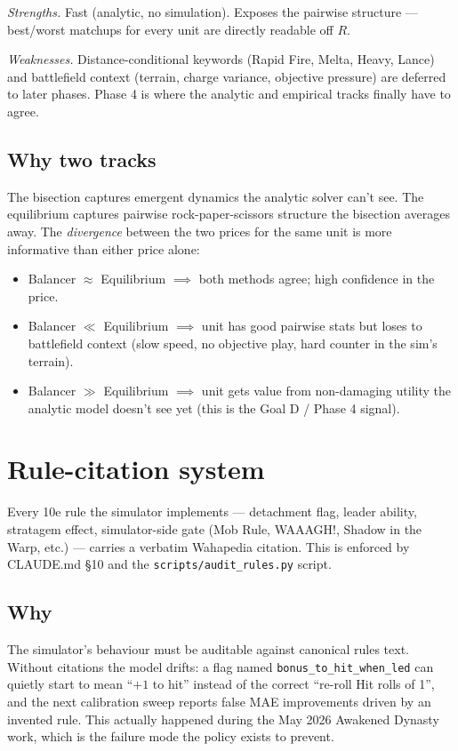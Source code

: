 \documentclass[11pt,a4paper]{article}
\begin{document}
\emph{Strengths.} Fast (analytic, no simulation). Exposes the pairwise
structure --- best/worst matchups for every unit are directly readable
off $R$.

\emph{Weaknesses.} Distance-conditional keywords (Rapid Fire, Melta,
Heavy, Lance) and battlefield context (terrain, charge variance,
objective pressure) are deferred to later phases. Phase 4 is where the
analytic and empirical tracks finally have to agree.

\subsection{Why two tracks}

The bisection captures emergent dynamics the analytic solver can't see.
The equilibrium captures pairwise rock-paper-scissors structure the
bisection averages away. The \emph{divergence} between the two prices
for the same unit is more informative than either price alone:

\begin{itemize}[itemsep=2pt]
  \item Balancer $\approx$ Equilibrium $\implies$ both methods agree;
    high confidence in the price.
  \item Balancer $\ll$ Equilibrium $\implies$ unit has good pairwise
    stats but loses to battlefield context (slow speed, no objective
    play, hard counter in the sim's terrain).
  \item Balancer $\gg$ Equilibrium $\implies$ unit gets value from
    non-damaging utility the analytic model doesn't see yet (this is
    the Goal D / Phase 4 signal).
\end{itemize}

\section{Rule-citation system}
\label{sec:citations}

Every 10e rule the simulator implements --- detachment flag, leader
ability, stratagem effect, simulator-side gate (Mob Rule, WAAAGH!,
Shadow in the Warp, etc.) --- carries a verbatim Wahapedia citation.
This is enforced by CLAUDE.md \S 10 and the \texttt{scripts/audit\_rules.py}
script.

\subsection{Why}
The simulator's behaviour must be auditable against canonical rules
text. Without citations the model drifts: a flag named
\texttt{bonus\_to\_hit\_when\_led} can quietly start to mean ``$+1$ to
hit'' instead of the correct ``re-roll Hit rolls of 1'', and the next
calibration sweep reports false MAE improvements driven by an invented
rule. This actually happened during the May 2026 Awakened Dynasty work,
which is the failure mode the policy exists to prevent.
\end{document}
